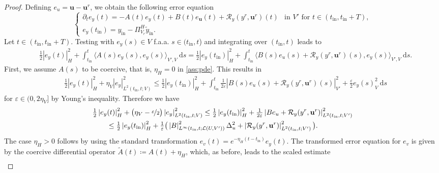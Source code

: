 \documentclass{m2an}
\newcommand{\ddt}{\partial_t}
\newcommand{\bu}{\mathbf{u}}
\newcommand{\ds}{\ \mathrm{d}s}
\newcommand{\reduce}[1]{{{#1}^r}}
\newcommand{\tint}{t_{\mathrm{in}}}
\newcommand{\yint}{y_{\mathrm{in}}}
\newcommand{\tildeyint}{\tilde y_{\mathrm{in}}}
\newcommand{\calL}{\mathcal{L}}
\newcommand{\calR}{\mathcal{R}}
\newcommand{\Res}{\calR}%
\newcommand{\norm}[2]{\left|#1\right|_{#2}}
\begin{document}
\begin{proof}
    Defining $e_u= \bu-\reduce\bu$, we obtain the following error equation
    \begin{equation}
    \label{eq:error_eq}
    \begin{cases}
    \ddt e_y(t)=-{A}(t)e_y(t)+{B}(t)e_{\bu}(t)+ \Res_y(\reduce y, \reduce \bu)(t) &\text{in } V'\text{ for } t \in ( \tint,\tint+T),\\
    e_y(\tint)= \yint- \Pi^H_{V_r}\tildeyint. &
    \end{cases}
    \end{equation}
    Let $t\in (\tint,\tint+T)$. Testing with $e_y(s)\in V$ f.a.a. $s\in (\tint,t$) and integrating over $(\tint,t)$ leads to
    \begin{align*}
        &\tfrac{1}{2} \norm{e_y(t)}{H}^2 + \int_{\tint}^{t}{\langle A(s) e_y(s), e_y(s) \rangle}_{V',V} \ds=  \tfrac{1}{2} \norm{e_y(\tint)}{H}^2 +\int_{\tint}^{t} \langle B(s)e_u(s) + \Res_y(\reduce y, \reduce \bu)(s), e_y(s)\rangle_{V',V} \ds .
    \end{align*}
    First, we assume $A(s)$ to be coercive, that is, $\eta_H=0$ in \cref{ass:pde}. 
    This results in
    \begin{align*}
        &\tfrac{1}{2}\norm{e_y(t)}{H}^2 + \eta_V \norm{e_y}{L^2(\tint,t;V)}^2\leq   \tfrac{1}{2}\norm{e_y(\tint)}{H}^2 + \int_{\tint}^{t}\tfrac{1}{2\varepsilon} \norm{ B(s)e_u(s) + \Res_y(\reduce y, \reduce \bu)(s)}{V'}^2 +\tfrac{\varepsilon}{2}{e_y(s)}_V^2 \ds
    \end{align*}
    for $\varepsilon\in (0,2\eta_V]$ by Young's inequality. Therefore we have
    \begin{align*}
       &\tfrac{1}{2}\norm{e_y(t)}{H}^2 +\big(\eta_V-\nicefrac{\varepsilon}{2}\big) \norm{e_y}{L^2(\tint,t;V)}^2\le\tfrac{1}{2}\norm{e_y(\tint)}{H}^2 + \tfrac{1}{2\varepsilon} \norm{ Be_u +  \Res_y(\reduce y, \reduce \bu)}{L^2(\tint,t;V')}^2\\
        &\qquad\leq  \tfrac{1}{2}\norm{e_y(\tint)}{H}^2 + \tfrac{1}{\varepsilon} \big(\norm{B}{L^\infty(\tint,t;\calL(U,V'))}^2\Delta_u^2 +\norm{\Res_y(\reduce y, \reduce \bu)}{L^2(\tint,t;V')}^2\big).
    \end{align*}
    The case $\eta_H>0$ follows by using the standard transformation $e_v(t)=e^{-\eta_H (t-\tint)}e_y(t)$. The transformed error equation for $e_v$ is given by the coercive differential operator $\tilde A(t)\coloneqq A(t)+\eta_H$, which, as before, leads to the scaled estimate
    \begin{align}\nonumber

\end{align}
\end{proof}
\end{document}
